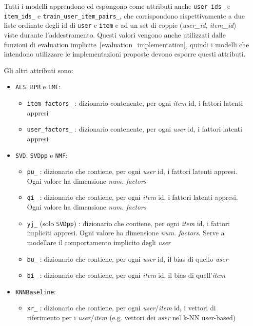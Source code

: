 Tutti i modelli apprendono ed espongono come attributi anche \texttt{user\_ids\_} e \texttt{item\_ids\_} e \texttt{train\_user\_item\_pairs\_}, che corrispondono rispettivamente a due liste ordinate degli id di \texttt{user} e \texttt{item} e ad un set di coppie (\textit{user\_id}, \textit{item\_id}) viste durante l'addestramento. Questi valori vengono anche utilizzati dalle funzioni di evaluation implicite~\ref{evaluation_implementation}, quindi i modelli che intendono utilizzare le implementazioni proposte devono esporre questi attributi.

Gli altri attributi sono:

\begin{itemize}
    \item \texttt{ALS}, \texttt{BPR} e \texttt{LMF}:
    \begin{itemize}
        \item \texttt{item\_factors\_} : dizionario contenente, per ogni \textit{item} id, i fattori latenti appresi
        \item \texttt{user\_factors\_} : dizionario contenente, per ogni \textit{user} id, i fattori latenti appresi
    \end{itemize}
    \item \texttt{SVD}, \texttt{SVDpp} e \texttt{NMF}:
    \begin{itemize}
        \item \texttt{pu\_} : dizionario che contiene, per ogni \textit{user} id, i fattori latenti appresi. Ogni valore ha dimensione \textit{num. factors}
        \item \texttt{qi\_} : dizionario che contiene, per ogni \textit{item} id, i fattori latenti appresi. Ogni valore ha dimensione \textit{num. factors}
        \item \texttt{yj\_} (solo \texttt{SVDpp}) : dizionario che contiene, per ogni \textit{item} id, i fattori impliciti appresi. Ogni valore ha dimensione \textit{num. factors}. Serve a modellare il comportamento implicito degli \textit{user}
        \item \texttt{bu\_} : dizionario che contiene, per ogni \textit{user} id, il bias di quello \textit{user}
        \item \texttt{bi\_} : dizionario che contiene, per ogni \textit{item} id, il bias di quell'\textit{item}
    \end{itemize}
    \item \texttt{KNNBaseline}: 
    \begin{itemize}
        \item \texttt{xr\_} : dizionario che contiene, per ogni \textit{user}/\textit{item} id, i vettori di riferimento per i \textit{user}/\textit{item} (e.g. vettori dei \textit{user} nel k-NN user-based)

\end{itemize}
\end{itemize}
